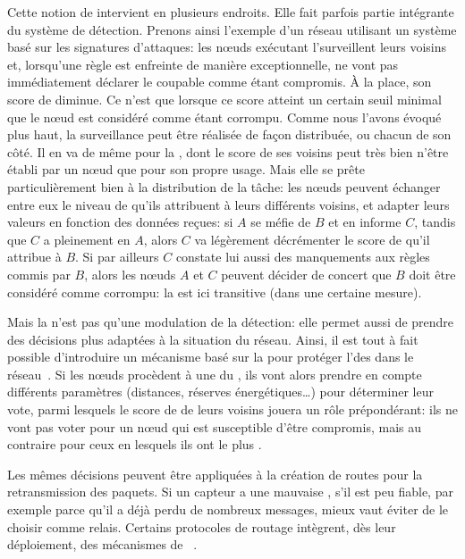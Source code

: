 Cette notion de  intervient en plusieurs endroits.
Elle fait parfois partie intégrante du système de détection.
Prenons ainsi l'exemple d'un réseau utilisant un système basé sur les signatures d'attaques: les nœuds exécutant l'\IDS surveillent leurs voisins et, lorsqu'une règle est enfreinte de manière exceptionnelle, ne vont pas immédiatement déclarer le coupable comme étant compromis.
À la place, son score de \reput diminue.
Ce n'est que lorsque ce score atteint un certain seuil minimal que le nœud est considéré comme étant corrompu.
Comme nous l'avons évoqué plus haut, la surveillance peut être réalisée de façon distribuée, ou chacun de son côté.
Il en va de même pour la \reput, dont le score de ses voisins peut très bien n'être établi par un nœud que pour son propre usage.
Mais elle se prête particulièrement bien à la distribution de la tâche: les nœuds peuvent échanger entre eux le niveau de  qu'ils attribuent à leurs différents voisins, et adapter leurs valeurs en fonction des données reçues: si $A$ se méfie de $B$ et en informe $C$, tandis que $C$ a pleinement  en $A$, alors $C$ va légèrement décrémenter le score de \reput qu'il attribue à $B$.
Si par ailleurs $C$ constate lui aussi des manquements aux règles commis par $B$, alors les nœuds $A$ et $C$ peuvent décider de concert que $B$ doit être considéré comme corrompu: la  est ici transitive (dans une certaine mesure).

Mais la  n'est pas qu'une modulation de la détection: elle permet aussi de prendre des décisions plus adaptées à la situation du réseau.
Ainsi, il est tout à fait possible d'introduire un mécanisme basé sur la  pour protéger l'\election des \chs dans le réseau~\cite{CPG06}.
Si les nœuds procèdent à une \election du \CH, ils vont alors prendre en compte différents paramètres (distances, réserves énergétiques\dots) pour déterminer leur vote, parmi lesquels le score de \reput de leurs voisins jouera un rôle prépondérant: ils ne vont pas voter pour un nœud qui est susceptible d'être compromis, mais au contraire pour ceux en lesquels ils ont le plus .

Les mêmes décisions peuvent être appliquées à la création de routes pour la retransmission des paquets.
Si un capteur a une mauvaise \reput, \cad s'il est peu fiable, par exemple parce qu'il a déjà perdu de nombreux messages, mieux vaut éviter de le choisir comme relais.
Certains protocoles de routage intègrent, dès leur déploiement, des mécanismes de ~\cite{ZTLMK13}.

